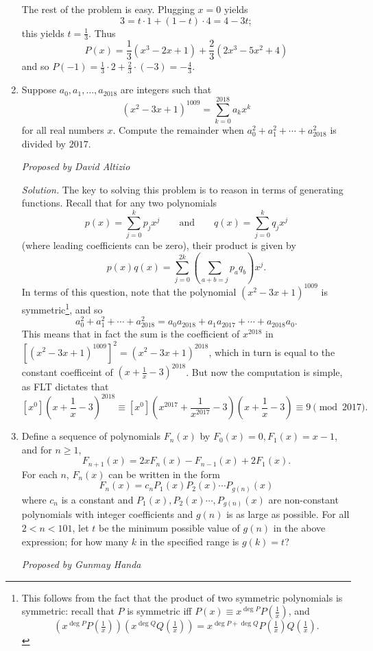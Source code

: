 \documentclass[10pt]{article}
\newcommand{\proposed}[1]
{
\vspace{5pt}
\noindent\textit{Proposed by #1}
}
\newcommand{\solution}
{
\vspace{5pt}
\noindent\textit{Solution.}\qquad
}
\begin{document}
\begin{enumerate}
\par The rest of the problem is easy.  Plugging $x=0$ yields \[3 = t\cdot 1 + (1-t)\cdot 4 = 4 - 3t;\] this yields $t = \frac13$.  Thus \[P(x) = \frac13(x^3 - 2x + 1) + \frac23(2x^3 - 5x^2 + 4)\] and so $P(-1) = \tfrac13\cdot 2 + \tfrac23\cdot (-3) = \boxed{-\tfrac43}$.

\item Suppose $a_0,a_1,\ldots, a_{2018}$ are integers such that \[(x^2-3x+1)^{1009} = \sum_{k=0}^{2018}a_kx^k\] for all real numbers $x$.  Compute the remainder when $a_0^2 + a_1^2 + \cdots + a_{2018}^2$ is divided by $2017$.

\proposed{David Altizio}

\solution The key to solving this problem is to reason in terms of generating functions.  Recall that for any two polynomials \[p(x) = \sum_{j=0}^kp_jx^j\qquad\text{and}\qquad q(x) = \sum_{j=0}^k q_jx^j\] (where leading coefficients can be zero), their product is given by \[p(x)q(x) = \sum_{j=0}^{2k}\left(\sum_{a+b=j}p_aq_b\right)x^j.\] In terms of this question, note that the polynomial $(x^2-3x+1)^{1009}$ is symmetric\footnote{This follows from the fact that the product of two symmetric polynomials is symmetric: recall that $P$ is symmetric iff $P(x) \equiv x^{\deg P}P(\tfrac 1x)$, and \[(x^{\deg P}P(\tfrac 1x))(x^{\deg Q}Q(\tfrac 1x)) = x^{\deg P + \deg Q}P(\tfrac1x)Q(\tfrac1x).\]}, and so \[a_0^2 + a_1^2 + \cdots + a_{2018}^2 = a_0a_{2018} + a_1a_{2017} + \cdots + a_{2018}a_0.\] This means that in fact the sum is the coefficient of $x^{2018}$ in $\left[(x^2-3x+1)^{1009}\right]^2 = (x^2-3x+1)^{2018}$, which in turn is equal to the constant coefficeint of $(x+\tfrac1x - 3)^{2018}$.  But now the computation is simple, as FLT dictates that \[[x^0]\left(x + \frac 1x - 3\right)^{2018}\equiv [x^0]\left(x^{2017} + \frac{1}{x^{2017}} - 3\right)\left(x + \frac 1x - 3\right)\equiv \boxed 9\pmod{2017}.\]

\item Define a sequence of polynomials $F_n(x)$ by $F_0(x)=0, F_1(x)=x-1$, and for $n\geq 1$, $$F_{n+1}(x)=2xF_n(x)-F_{n-1}(x)+2F_1(x).$$ For each $n$, $F_n(x)$ can be written in the form $$F_n(x)=c_nP_1(x)P_2(x)\cdots P_{g(n)}(x)$$ where $c_n$ is a constant and $P_1(x),P_2(x)\cdots, P_{g(n)}(x)$ are non-constant polynomials with integer coefficients and $g(n)$ is as large as possible. For all $2< n< 101$, let $t$ be the minimum possible value of $g(n)$ in the above expression; for how many $k$ in the specified range is $g(k)=t$?

\proposed{Gunmay Handa}


\end{enumerate}
\end{document}
